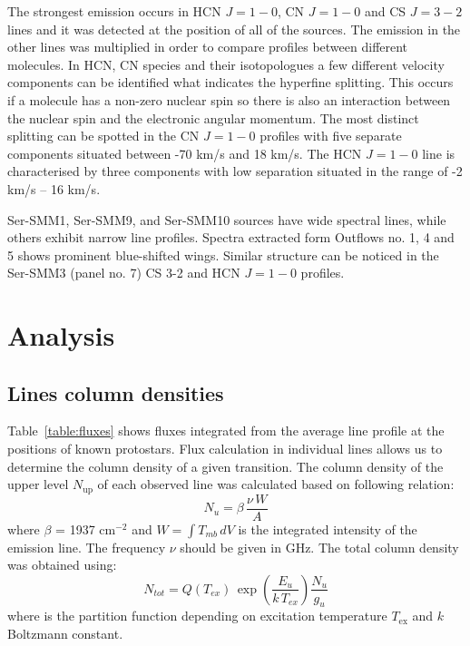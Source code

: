 \documentclass{aa}
\begin{document}
The strongest emission occurs in HCN $J=1-0$, CN $J=1-0$ and CS $J=3-2$ lines and it was detected at the position of all of the sources. The emission in the other lines was multiplied in order to compare profiles between different molecules. In HCN, CN species and their isotopologues a few different velocity components can be identified what indicates the hyperfine splitting. This occurs if a molecule has a non-zero nuclear spin so there is also an interaction between the nuclear spin and the electronic angular momentum. The most distinct splitting can be spotted in the CN $J=1-0$ profiles with five separate components situated between -70 km/s and 18 km/s. The HCN $J=1-0$ line is characterised by three components with low separation situated in the range of -2 km/s – 16 km/s. 

Ser-SMM1, Ser-SMM9, and Ser-SMM10 sources have wide spectral lines, while others exhibit narrow line profiles. Spectra extracted form Outflows no. 1, 4 and 5 shows prominent blue-shifted wings. Similar structure can be noticed in the Ser-SMM3 (panel no. 7) CS 3-2 and HCN $J=1-0$ profiles. 


\section{Analysis}

\subsection{Lines column densities}

Table~\ref{table:fluxes} shows fluxes integrated from the average line profile at the positions of known protostars. 
Flux calculation in individual lines allows us to determine the column density of a given transition. The column density of the upper level $N_\mathrm{up}$ of each observed line was calculated based on following relation:
\begin{equation} \label{eq1}
N_u = \beta \, \frac{\nu \, W}{A}
\end{equation}
where $\beta$ = 1937 cm$^{-2}$ and $W = \int{T_{mb} \, dV}$ is the integrated intensity of the emission line. The frequency $\nu$ should be given in GHz. The total column density was obtained using:
\begin{equation} \label{eq2}
N_{tot} = Q(T_{ex}) \, \exp(\frac{E_u }{k \, T_{ex} })  \frac{N_u }{g_u }
\end{equation}
where is the partition function depending on excitation temperature $T_\mathrm{ex}$ and $k$ Boltzmann constant.
\end{document}
